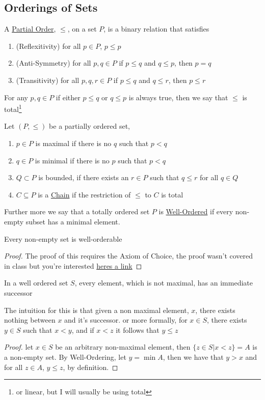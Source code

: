 \subsection{Orderings of Sets}
\begin{definition}
    A \href{https://en.wikipedia.org/wiki/Partially_ordered_set}{Partial Order}, $\leq$, on a set $P$, is a binary relation that satisfies
    \begin{enumerate}
        \item(Reflexitivity) for all $p\in P$, $p\leq p$ 
        \item(Anti-Symmetry) for all $p,q\in P$ if $p\leq q$ and $q\leq p$, then $p=q$
        \item(Transitivity) for all $p,q,r\in P$ if $p\leq q$ and $q\leq r$, then $p\leq r$
    \end{enumerate}
    For any $p,q\in P$ if either $p\leq q$ or $q\leq p$ is always true, then we say that $\leq$ is total\footnote{or linear, but I will usually be using total}
\end{definition}
Let $(P,\leq)$ be a partially ordered set,
\begin{enumerate}
    \item $p\in P$ is maximal if there is no $q$ such that $p<q$
    \item $q\in P$ is minimal if there is no $p$ such that $p<q$
    \item $Q\subset P$ is bounded, if there exists an $r\in P$ such that $q\leq r$ for all $q\in Q$
    \item $C\subseteq P$ is a \href{https://proofwiki.org/wiki/Definition:Chain_(Order_Theory)}{Chain} if the restriction of $\leq$ to $C$ is total
\end{enumerate}
Further more we say that a totally ordered set $P$ is \href{https://en.wikipedia.org/wiki/Well-order}{Well-Ordered} if every non-empty subset has a minimal element.
\begin{theorem}
    Every non-empty set is well-orderable
\end{theorem}
\begin{proof}
    The proof of this requires the Axiom of Choice, the proof wasn't covered in class but you're interested \href{https://en.wikipedia.org/wiki/Well-ordering_theorem#Proof_from_axiom_of_choice}{heres a link}
\end{proof}
\begin{proposition}
    In a well ordered set $S$, every element, which is not maximal, has an immediate successor
\end{proposition}
\begin{remark}
    The intuition for this is that given a non maximal element, $x$, there exists nothing between $x$ and it's successor. or more formally, for $x\in S$, there exists $y\in S$ such that $x<y$, and if $x<z$ it follows that $y\leq z$
\end{remark}
\begin{proof}
    let $x\in S$ be an arbitrary non-maximal element, then $\{z\in S\vert x<z\}=A$ is a non-empty set. By Well-Ordering, let $y=\min{A}$, then we have that $y>x$ and for all $z\in A$, $y\leq z$, by definition.
\end{proof}
